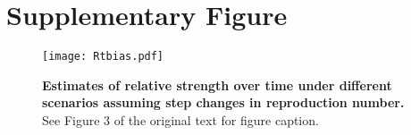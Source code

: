 \documentclass[12pt]{article}
\begin{document}
\pagebreak

\section*{Supplementary Figure}

\setcounter{figure}{0}    
\renewcommand\thefigure{S\arabic{figure}}    

\begin{figure}[!pht]
\begin{center}
\texttt{[image: Rtbias.pdf]}
\caption{
\textbf{Estimates of relative strength over time under different scenarios assuming step changes in reproduction number.}
See Figure 3 of the original text for figure caption.
}
\end{center}
\label{fig:Rtbias}
\end{figure}


\pagebreak


\end{document}
